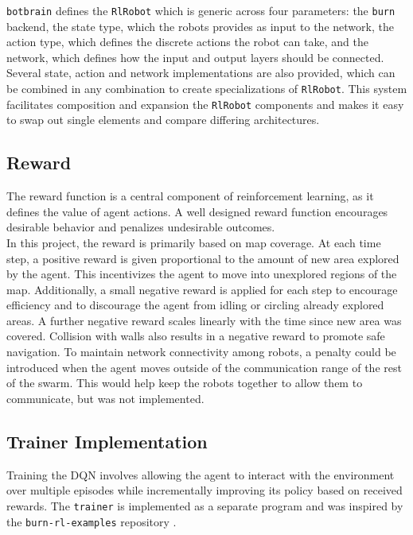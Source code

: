 \texttt{botbrain} defines the \texttt{RlRobot} which is generic across four parameters: the \texttt{burn} backend, the state type, which the robots provides as input to the network, the action type, which defines the discrete actions the robot can take, and the network, which defines how the input and output layers should be connected. Several state, action and network implementations are also provided, which can be combined in any combination to create specializations of \texttt{RlRobot}. This system facilitates composition and expansion the \texttt{RlRobot} components and makes it easy to swap out single elements and compare differing architectures.



\subsection{Reward}
The reward function is a central component of reinforcement learning, as it defines the value of agent actions. A well designed reward function encourages desirable behavior and penalizes undesirable outcomes. \\

In this project, the reward is primarily based on map coverage. At each time step, a positive reward is given proportional to the amount of new area explored by the agent. This incentivizes the agent to move into unexplored regions of the map. Additionally, a small negative reward is applied for each step to encourage efficiency and to discourage the agent from idling or circling already explored areas. A further negative reward scales linearly with the time since new area was covered. Collision with walls also results in a negative reward to promote safe navigation. To maintain network connectivity among robots, a penalty could be introduced when the agent moves outside of the communication range of the rest of the swarm. This would help keep the robots together to allow them to communicate, but was not implemented.

\subsection{Trainer Implementation}
Training the DQN involves allowing the agent to interact with the environment over multiple episodes while incrementally improving its policy based on received rewards. The \texttt{trainer} is implemented as a separate program and was inspired by the \texttt{burn-rl-examples} repository \cite{burn-rl-examples}. \\


